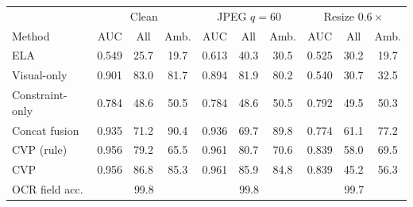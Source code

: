 \begin{tabular}{lccccccccc}
\toprule
 & \multicolumn{3}{c}{Clean} & \multicolumn{3}{c}{JPEG $q{=}60$} & \multicolumn{3}{c}{Resize $0.6\times$}\\
Method & AUC & All & Amb. & AUC & All & Amb. & AUC & All & Amb.\\
\midrule
ELA & 0.549 & 25.7 & 19.7 & 0.613 & 40.3 & 30.5 & 0.525 & 30.2 & 19.7\\
Visual-only & 0.901 & 83.0 & 81.7 & 0.894 & 81.9 & 80.2 & 0.540 & 30.7 & 32.5\\
Constraint-only & 0.784 & 48.6 & 50.5 & 0.784 & 48.6 & 50.5 & 0.792 & 49.5 & 50.3\\
Concat fusion & 0.935 & 71.2 & 90.4 & 0.936 & 69.7 & 89.8 & 0.774 & 61.1 & 77.2\\
CVP (rule) & 0.956 & 79.2 & 65.5 & 0.961 & 80.7 & 70.6 & 0.839 & 58.0 & 69.5\\
CVP & 0.956 & 86.8 & 85.3 & 0.961 & 85.9 & 84.8 & 0.839 & 45.2 & 56.3\\
\midrule
OCR field acc. & \multicolumn{3}{c}{99.8} & \multicolumn{3}{c}{99.8} & \multicolumn{3}{c}{99.7}\\
\bottomrule
\end{tabular}
